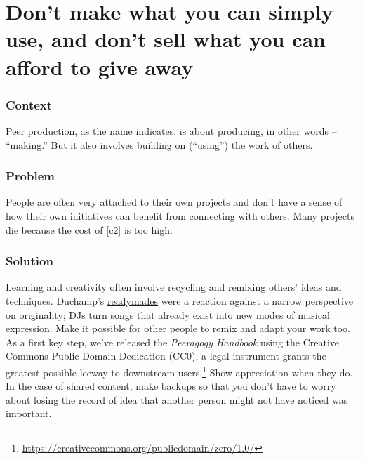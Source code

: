 \begingroup \color{BurntOrange}

\section{Don't make what you can simply use, and don't sell what you can afford to give away} \label{sec:Use_or_make}

\subsubsection*{Context}
Peer production, as the name indicates, is about producing, in other words -- ``making.'' But it also involves building on (``using'') the work of others.

\subsubsection*{Problem}
People are often very attached to their own projects and don't have a sense of how their own initiatives can benefit from connecting with others. Many projects die because the cost of  [c2] is too high.

\subsubsection*{Solution} Learning and creativity often involve recycling and remixing others' ideas and techniques.   Duchamp's {\href{https://en.wikipedia.org/w/index.php?title=Readymades_of_Marcel_Duchamp&oldid=660437742}{readymades}} were a reaction against a narrow perspective on originality; DJs turn songs that already exist into new modes of musical expression.  Make it possible for other people to remix and adapt your work too.  As a first key step, we've released the \emph{Peeragogy Handbook} using the Creative Commons Public Domain Dedication (CC0), a legal instrument grants the greatest possible leeway to downstream users.\footnote{\url{https://creativecommons.org/publicdomain/zero/1.0/}}  Show appreciation when they do.  In the case of shared content, make backups so that you don't have to worry about losing the record of idea that another person might not have noticed was important.

